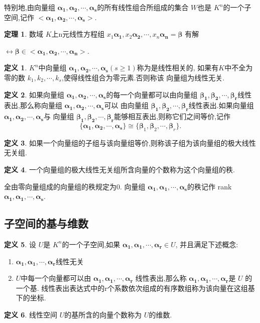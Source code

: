 \documentclass[a4paper,11pt]{article}%
\theoremstyle{remark}
\theoremstyle{definition}
\newtheorem{theorem}{定理}[section]
\theoremstyle{definition}
\newtheorem*{definition}{定义}
\theoremstyle{plain}
\begin{document}
特别地,由向量组 $\bm{\alpha_1},\bm{\alpha_2},\cdots,\bm{\alpha_s}$的所有线性组合所组成的集合
$W$也是 $K^n$的一个子空间,记作 $<\bm{\alpha_1},\bm{\alpha_2},\cdots,\bm{\alpha_s}>$.
\begin{theorem}
    数域 $K$上n元线性方程组 $x_1\bm{\alpha_1},x_2\bm{\alpha_2},\cdots,x_n\bm{\alpha_n}=\bm{\beta}$
    有解

   $ \leftrightarrow \bm{\beta}\in <\bm{\alpha_1},\bm{\alpha_2},\cdots,\bm{\alpha_n}>$.
\end{theorem}
\begin{definition}
    $K^n$中向量组 $\bm{\alpha_1},\bm{\alpha_2},\cdots,\bm{\alpha_s}(s\geq1)$称为是线性相关的,
    如果有$K$中不全为零的数 $k_1,k_2,\cdots,k_s$,使得线性组合为零元素.否则称该
    向量组为线性无关.
\end{definition}
\begin{definition}
   如果向量组 $\bm{\alpha_1},\bm{\alpha_2},\cdots,\bm{\alpha_s}$的每一个向量都可以由向量组
   $\bm{\beta_1},\bm{\beta_2},\cdots,\bm{\beta_r}$线性表出,那么称向量组 $\bm{\alpha_1},\bm{\alpha_2},\cdots,\bm{\alpha_s}$可以
   由向量组 $\bm{\beta_1},\bm{\beta_2},\cdots,\bm{\beta_r}$线性表出.如果向量组  $\bm{\alpha_1},\bm{\alpha_2},\cdots,\bm{\alpha_s}$与
   向量组 $\bm{\beta_1},\bm{\beta_2},\cdots,\bm{\beta_r}$能够相互表出,则称它们之间等价,记作
   \[\{\bm{\alpha_1},\bm{\alpha_2},\cdots,\bm{\alpha_s}\}\cong \{\bm{\beta}_1,\bm{\beta}_2,\cdots,\bm{\beta}_r\}.\]
\end{definition}
\begin{definition}
    如果一个向量组的子组与该向量组等价,则称该子组为该向量组的极大线性无关组.
\end{definition}
\begin{definition}
    一个向量组的极大线性无关组所含向量的个数称为这个向量组的秩.
\end{definition}
全由零向量组成的向量组的秩规定为0.
向量组 $\bm{\alpha_1},\bm{\alpha_1},\cdots,\bm{\alpha_s}$的秩记作 rank $\bm{\alpha_1},\bm{\alpha_1},\cdots,\bm{\alpha_s}$.
\subsection{子空间的基与维数}
\begin{definition}
    设 $U$是 $K^n$的一个子空间,如果 $\bm{\alpha_1},\bm{\alpha_1},\cdots,\bm{\alpha_r}\in U$,
    并且满足下述概念:
    \begin{enumerate}
        \item $\bm{\alpha_1},\bm{\alpha_1},\cdots,\bm{\alpha_r}$线性无关
        \item $U$中每一个向量都可以由 $\bm{\alpha_1},\bm{\alpha_1},\cdots,\bm{\alpha_r}$
    线性表出,那么称 $\bm{\alpha_1},\bm{\alpha_1},\cdots,\bm{\alpha_r}$是 $U$ 的一个基.
    线性表出表达式中的r个系数依次组成的有序数组称为该向量在这组基下的坐标.
    \end{enumerate}
\end{definition}
\begin{definition}
    线性空间 $U$的基所含的向量个数称为 $U$的维数.
\end{definition}
\end{document}

